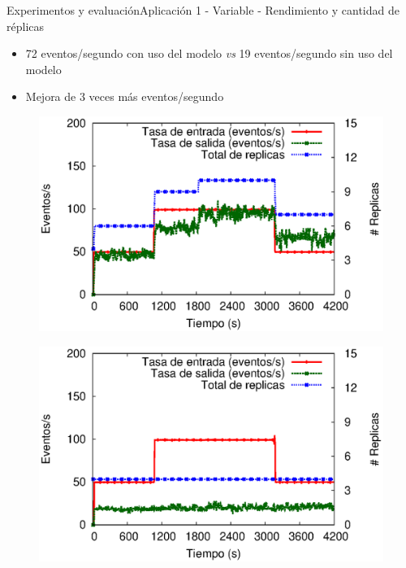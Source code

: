
\begin{frame}{Experimentos y evaluación}{Aplicación 1 - Variable - Rendimiento y cantidad de réplicas}

\begin{itemize}
\item 72 eventos/segundo con uso del modelo \textit{vs} 19 eventos/segundo sin uso del modelo
\item Mejora de 3 veces más eventos/segundo
\end{itemize}

\begin{multicols}{2}
\begin{figure}[p]
	\centering
	\includegraphics[scale=0.4]{images/exp/app1/normal/cm/processSystem.eps}
\end{figure}

\begin{figure}[p]
	\centering
	\includegraphics[scale=0.4]{images/exp/app1/normal/sm/processSystem.eps}
\end{figure}
\end{multicols}
\end{frame}

